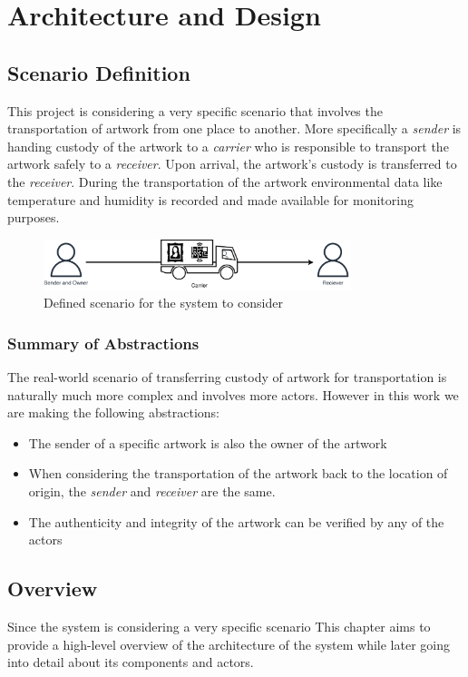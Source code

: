 \chapter{Architecture and Design}

\section{Scenario Definition}
This project is considering a very specific scenario that involves the transportation of artwork from one place to another. More specifically a \textit{sender} is handing custody of the artwork to a \textit{carrier} who is responsible to transport the artwork safely to a \textit{receiver}. Upon arrival, the artwork's custody is transferred to the \textit{receiver}. During the transportation of the artwork environmental data like temperature and humidity is recorded and made available for monitoring purposes.

\begin{figure}
    \centering
    \includegraphics[width=0.8\textwidth]{diagrams/Scenario.drawio.pdf}
    \caption{Defined scenario for the system to consider}
    \label{fig:scenario}
\end{figure}

\subsection*{Summary of Abstractions}
The real-world scenario of transferring custody of artwork for transportation is naturally much more complex and involves more actors. \cite{artintransit} However in this work we are making the following abstractions:
\begin{itemize}
    \item The sender of a specific artwork is also the owner of the artwork
    \item When considering the transportation of the artwork back to the location of origin, the \textit{sender} and \textit{receiver} are the same.
    \item The authenticity and integrity of the artwork can be verified by any of the actors
\end{itemize}

\section{Overview}
Since the system is considering a very specific scenario This chapter aims to provide a high-level overview of the architecture of the system while later going into detail about its components and actors.

